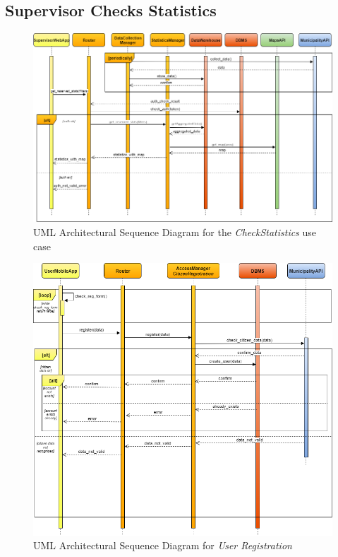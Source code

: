 \documentclass[a4paper]{report}
\begin{document}
\subsection{Supervisor Checks Statistics}
\begin{landscape}

\begin{figure}[hp]
\includegraphics[angle=0, scale=0.70]{ArchSequenceCheckStatistics}
\caption{UML Architectural Sequence Diagram for the \textit{CheckStatistics} use case}
\label{fig:seq-checkStats}
\end{figure}

\end{landscape}

\begin{figure}[hp]
\includegraphics[scale=0.7]{ArchSequenceRegistration}
\caption{UML Architectural Sequence Diagram for \textit{User Registration}}
\label{fig:seq-checkReport}
\end{figure}
\restoregeometry
\end{document}
